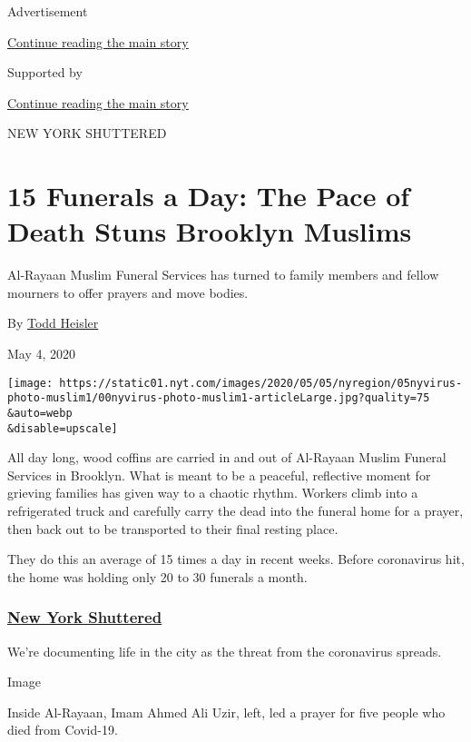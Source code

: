 Advertisement

\protect\hyperlink{after-top}{Continue reading the main story}

Supported by

\protect\hyperlink{after-sponsor}{Continue reading the main story}

NEW YORK SHUTTERED

\hypertarget{15-funerals-a-day-the-pace-of-death-stuns-brooklyn-muslims}{%
\section{15 Funerals a Day: The Pace of Death Stuns Brooklyn
Muslims}\label{15-funerals-a-day-the-pace-of-death-stuns-brooklyn-muslims}}

Al-Rayaan Muslim Funeral Services has turned to family members and
fellow mourners to offer prayers and move bodies.

By \href{https://www.nytimes.com/by/todd-heisler}{Todd Heisler}

May 4, 2020

\texttt{[image: https://static01.nyt.com/images/2020/05/05/nyregion/05nyvirus-photo-muslim1/00nyvirus-photo-muslim1-articleLarge.jpg?quality=75\\\&auto=webp\\\&disable=upscale]}

All day long, wood coffins are carried in and out of Al-Rayaan Muslim
Funeral Services in Brooklyn. What is meant to be a peaceful, reflective
moment for grieving families has given way to a chaotic rhythm. Workers
climb into a refrigerated truck and carefully carry the dead into the
funeral home for a prayer, then back out to be transported to their
final resting place.

They do this an average of 15 times a day in recent weeks. Before
coronavirus hit, the home was holding only 20 to 30 funerals a month.

\hypertarget{new-york-shuttered}{%
\subsubsection{\texorpdfstring{\href{https://www.nytimes.com/spotlight/new-york-shuttered}{New
York Shuttered}}{New York Shuttered}}\label{new-york-shuttered}}

We're documenting life in the city as the threat from the coronavirus
spreads.

Image

Inside Al-Rayaan, Imam Ahmed Ali Uzir, left, led a prayer for five
people who died from Covid-19.

